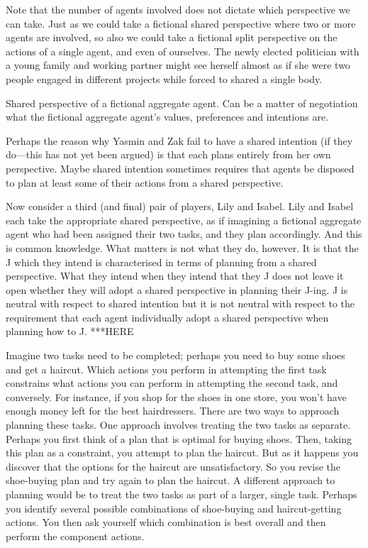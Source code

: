 \documentclass[12pt,\papersize]{extarticle}
\begin{document}
Note that the number of agents involved does not dictate which perspective we can take.
Just as we could take a fictional shared perspective where two or more agents are involved, 
so also we could take a fictional split perspective on the actions of  a single agent, and even of ourselves.
The newly elected  politician with a young family and working partner might see herself almost as if she were two people engaged in different projects while forced to shared a single body. 

Shared perspective of a fictional aggregate agent.
Can be a matter of negotiation what the fictional aggregate agent's values, preferences and intentions are.

Perhaps the reason why Yasmin and Zak fail to have a shared intention (if they do---this has not yet been argued) is that each plans entirely from her own perspective. 
Maybe shared intention sometimes requires that agents be disposed to plan at least some of their actions from a shared perspective.

Now consider a third (and final) pair of players, Lily and Isabel.
Lily and Isabel each take the appropriate shared perspective, as if imagining a fictional aggregate agent who had been assigned their two tasks, 
and they plan accordingly.
And this is common knowledge.
What matters is not what they do, however.
It is that the J which they intend is characterised in terms of planning from a shared perspective.
What they intend when they intend that they J does not leave it open whether they will adopt a shared perspective in planning their J-ing.
J is neutral with respect to shared intention but it is not neutral with respect to the requirement that each agent individually adopt a shared perspective when planning how to J.
***HERE



Imagine two tasks need to be completed; perhaps you need to buy some shoes and get a haircut. 
Which actions you perform in attempting the first task constrains what actions you can perform in attempting the second task, and conversely.
For instance, if you shop for the shoes in one store, you won't have enough money left for the best hairdressers.
There are two ways to approach planning these tasks.
One approach involves treating the two tasks as separate.
Perhaps you first think of a plan that is optimal for buying shoes.
Then, taking this plan as a constraint, you attempt to plan the haircut.
But as it happens you discover that the options for the haircut are unsatisfactory.
So you revise the shoe-buying plan and try again to plan the haircut.
A different approach to planning would be to treat the two tasks as part of a larger, single task.
Perhaps you identify several possible combinations of shoe-buying and haircut-getting actions.
You then ask yourself which combination is best overall and then perform the component actions.
\end{document}
